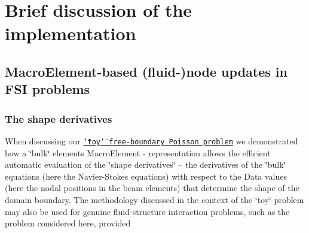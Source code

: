 \hypertarget{index_how_its_done}{}\section{Brief discussion of the implementation}\label{index_how_its_done}
\hypertarget{index_mesh}{}\subsection{Macro\+Element-\/based (fluid-\/)node updates in F\+S\+I problems}\label{index_mesh}
\hypertarget{index_shape_deriv}{}\subsubsection{The shape derivatives}\label{index_shape_deriv}
When discussing our \href{../../macro_element_free_boundary_poisson/html/index.html}{\tt \char`\"{}toy\char`\"{} free-\/boundary Poisson problem} we demonstrated how a \char`\"{}bulk\char`\"{} element\textquotesingle{}s {\ttfamily Macro\+Element} -\/ representation allows the efficient automatic evaluation of the \char`\"{}shape derivatives\char`\"{} -- the derivatives of the \char`\"{}bulk\char`\"{} equations (here the Navier-\/\+Stokes equations) with respect to the {\ttfamily Data} values (here the nodal positions in the beam elements) that determine the shape of the domain boundary. The methodology discussed in the context of the \char`\"{}toy\char`\"{} problem may also be used for genuine fluid-\/structure interaction problems, such as the problem considered here, provided
